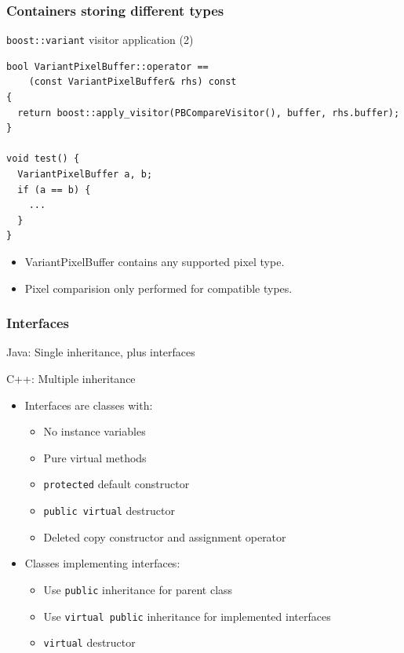 \documentclass[handout]{beamer}
\begin{document}
\begin{frame}[fragile]
  \frametitle{Containers storing different types}
  \begin{block}{\texttt{boost::variant} visitor application (2)}
    \scriptsize
    \begin{lstlisting}
bool VariantPixelBuffer::operator ==
    (const VariantPixelBuffer& rhs) const
{
  return boost::apply_visitor(PBCompareVisitor(), buffer, rhs.buffer);
}

void test() {
  VariantPixelBuffer a, b;
  if (a == b) {
    ...
  }
}
\end{lstlisting}
  \begin{itemize}
    \pause
  \item VariantPixelBuffer contains any supported pixel type.
  \item Pixel comparision only performed for compatible types.
  \end{itemize}
  \end{block}
\end{frame}

\begin{frame}[fragile]
  \frametitle{Interfaces}
\begin{block}{Java: Single inheritance, plus interfaces}
\end{block}
\begin{block}{C++: Multiple inheritance}
  \begin{itemize}
    \pause
  \item Interfaces are classes with:
    \begin{itemize}
      \item No instance variables
      \item Pure virtual methods
      \item \texttt{protected} default constructor
      \item \texttt{public virtual} destructor
      \item Deleted copy constructor and assignment operator
    \end{itemize}
    \pause
  \item Classes implementing interfaces:
    \begin{itemize}
      \item Use \texttt{public} inheritance for parent class
      \item Use \texttt{virtual public} inheritance for implemented interfaces
      \item \texttt{virtual} destructor
    \end{itemize}
  \end{itemize}
\end{block}
\end{frame}
\end{document}
